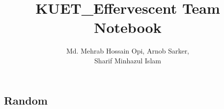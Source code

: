 \documentclass[8pt, a4paper, onesided]{article}
\title{\vspace{-2.5ex}KUET\_Effervescent Team Notebook}
\author{Md. Mehrab Hossain Opi, Arnob Sarker,\\Sharif Minhazul Islam}
\date{}
\begin{document}
\begin{landscape}
\begin{multicols*}{3}

\maketitle
\vspace{-7ex}
\tableofcontents
\pagestyle{fancy}
 
\raggedbottom


\section{Random}
    
\end{multicols*}


\end{landscape}
\end{document}
